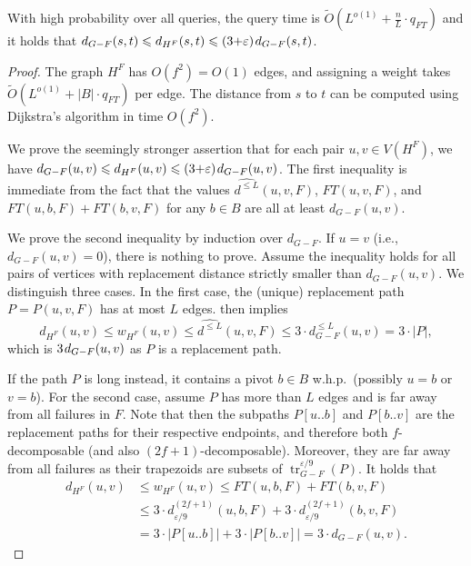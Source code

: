 \documentclass{theoretics}
\DeclareMathOperator{\tr}{tr}
\newcommand*{\Otilde}{\widetilde{O}}
\newcommand*{\length}[1]{|#1|}
\newcommand*{\nwspace}{\hspace*{.1em}}
\renewcommand{\le}{\leqslant}
\newcommand{\eps}{\varepsilon}
\begin{document}
\begin{lemma}
\label{lem:sublinear_query}
  With high probability over all queries, the query time is
  $\Otilde(L^{o(1)} + \frac{n}{L} \cdot q_{FT})$
  and it holds that
  $d_{G-F}(s,t) \le d_{H^F}(s,t) \le (3{+}\eps) \nwspace d_{G-F}(s,t)$. 
\end{lemma}

\begin{proof}
  The graph $H^F$ has $O(f^2) = O(1)$ edges, 
  and assigning a weight takes $\Otilde(L^{o(1)} + |B| \cdot q_{FT})$ per edge.
  The distance from $s$ to $t$ can be computed using Dijkstra's algorithm in time $O(f^2)$.
  
  We prove the seemingly stronger assertion that for each pair $u,v \in V(H^F)$,
  we have $d_{G-F}(u,v) \le d_{H^F}(u,v) \le (3{+}\eps) \nwspace d_{G-F}(u,v)$.
  The first inequality is immediate from the fact that the values 
  $\widehat{d^{\le L}}(u,v,F)$, $FT(u,v,F)$, and $FT(u,b,F) + FT(b,v,F)$ for any $b \in B$
  are all at least $d_{G-F}(u,v)$.
  
  We prove the second inequality by induction over $d_{G-F}$.
  If $u = v$ (i.e., $d_{G-F}(u,v) = 0$), there is nothing to prove.
  Assume the inequality holds for all pairs of vertices with replacement distance
  strictly smaller than $d_{G-F}(u,v)$.
  We distinguish three cases.
  In the first case, the (unique)
  replacement path $P = P(u,v,F)$ has at most $L$ edges.
   then implies
  \begin{equation*}
    d_{H^F}(u,v) \le w_{H^F}(u,v) \le \widehat{d^{\le L}}(u,v,F)
      \le 3 \cdot d_{G-F}^{\le L}(u,v) = 3 \cdot \length{P},
  \end{equation*}
  which is $3 \nwspace d_{G-F}(u,v)$ as $P$ is a replacement path.

  If the path $P$ is long instead,
  it contains a pivot $b \in B$ w.h.p.\ (possibly $u = b$ or $v = b$).
  For the second case, assume $P$ has more than $L$ edges and is far away from all failures in $F$.
  Note that then the subpaths $P[u..b]$ and $P[b..v]$ are the replacement paths
  for their respective endpoints,
  and therefore both $f$-decomposable (and also $(2f{+}1)$-decomposable).
  Moreover, they are far away from all failures
  as their trapezoids are subsets of $\tr^{\eps/9}_{G-F}(P)$.
  It holds that
  \begin{align*}
    d_{H^F}(u,v) &\le w_{H^F}(u,v) \le FT(u,b,F) + FT(b,v,F)\\
      &\le 3 \cdot d^{(2f+1)}_{\eps/9}(u,b,F)
        + 3 \cdot d^{(2f+1)}_{\eps/9}(b,v,F)\\
      &= 3 \cdot \length{P[u..b]}
        + 3 \cdot \length{P[b..v]}
      = 3 \cdot d_{G-F}(u,v). 
  \end{align*}  
  

\end{proof}
\end{document}
